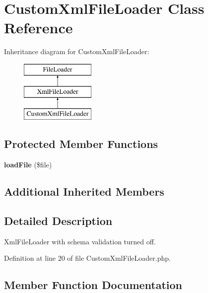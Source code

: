 \section{Custom\+Xml\+File\+Loader Class Reference}
\label{class_symfony_1_1_component_1_1_routing_1_1_tests_1_1_fixtures_1_1_custom_xml_file_loader}
Inheritance diagram for Custom\+Xml\+File\+Loader\+:\begin{figure}[H]
\begin{center}
\leavevmode
\includegraphics[height=3.000000cm]{class_symfony_1_1_component_1_1_routing_1_1_tests_1_1_fixtures_1_1_custom_xml_file_loader}
\end{center}
\end{figure}
\subsection*{Protected Member Functions}
\begin{DoxyCompactItemize}
\item 
{\bf load\+File} (\$file)
\end{DoxyCompactItemize}
\subsection*{Additional Inherited Members}


\subsection{Detailed Description}
Xml\+File\+Loader with schema validation turned off. 

Definition at line 20 of file Custom\+Xml\+File\+Loader.\+php.



\subsection{Member Function Documentation}
